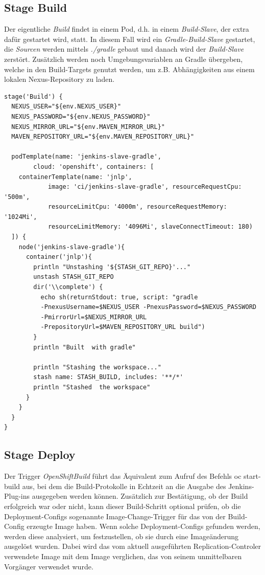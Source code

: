 \pagebreak

\subsection{Stage Build}

Der eigentliche \emph{Build} findet in einem Pod, d.h. in einem \emph{Build-Slave}, der extra dafür gestartet wird, statt. In diesem Fall wird ein \emph{Gradle-Build-Slave} gestartet, die \emph{Sourcen} werden mittels \emph{./gradle} gebaut und danach wird der \emph{Build-Slave} zerstört. Zusätzlich werden noch Umgebungsvariablen an Gradle übergeben, welche in den Build-Targets genutzt werden, um z.B. Abhängigkeiten aus einem lokalen Nexus-Repository zu laden.

\begin{verbatim}
stage('Build') {
  NEXUS_USER="${env.NEXUS_USER}"
  NEXUS_PASSWORD="${env.NEXUS_PASSWORD}"
  NEXUS_MIRROR_URL="${env.MAVEN_MIRROR_URL}"
  MAVEN_REPOSITORY_URL="${env.MAVEN_REPOSITORY_URL}"

  podTemplate(name: 'jenkins-slave-gradle',
        cloud: 'openshift', containers: [
    containerTemplate(name: 'jnlp',
            image: 'ci/jenkins-slave-gradle', resourceRequestCpu: '500m', 
            resourceLimitCpu: '4000m', resourceRequestMemory: '1024Mi', 
            resourceLimitMemory: '4096Mi', slaveConnectTimeout: 180)
  ]) {
    node('jenkins-slave-gradle'){
      container('jnlp'){
        println "Unstashing '${STASH_GIT_REPO}'..."
        unstash STASH_GIT_REPO
        dir('\\complete') {
          echo sh(returnStdout: true, script: "gradle 
          -PnexusUsername=$NEXUS_USER -PnexusPassword=$NEXUS_PASSWORD 
          -PmirrorUrl=$NEXUS_MIRROR_URL 
          -PrepositoryUrl=$MAVEN_REPOSITORY_URL build")
        }
        println "Built  with gradle"
          
        println "Stashing the workspace..."
        stash name: STASH_BUILD, includes: '**/*'
        println "Stashed  the workspace"
      }
    }
  }
}
\end{verbatim}

\pagebreak

\subsection{Stage Deploy}

Der Trigger \emph{OpenShiftBuild} führt das Äquivalent zum Aufruf des Befehls oc start-build aus, bei dem die Build-Protokolle in Echtzeit an die Ausgabe des Jenkins-Plug-ins ausgegeben werden können. Zusätzlich zur Bestätigung, ob der Build erfolgreich war oder nicht, kann dieser Build-Schritt optional prüfen, ob die Deployment-Configs sogenannte Image-Change-Trigger für das von der Build-Config erzeugte Image haben. Wenn solche Deployment-Configs gefunden werden, werden diese  analysiert, um festzustellen, ob sie durch eine Imageänderung ausgelöst wurden. Dabei wird das vom aktuell ausgeführten Replication-Controler verwendete Image mit dem Image verglichen, das von seinem unmittelbaren Vorgänger verwendet wurde.

